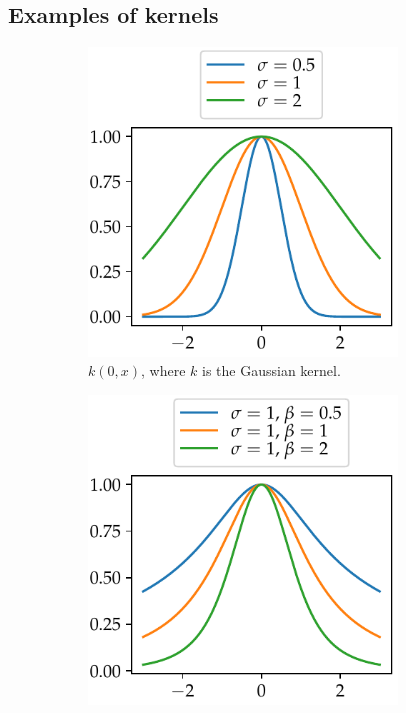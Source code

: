 \documentclass[11pt,twoside,openright]{report}
\begin{document}
\subsection{Examples of kernels}
\begin{figure}
  \centering
  \begin{subfigure}{0.5\textwidth}
    \centering
    \includegraphics[width=0.9\textwidth]{gaussian_kernel_plot.pdf}
    \caption{$k(0, x)$, where $k$ is the Gaussian kernel.}
    \label{fig:gaussian_kernel}
  \end{subfigure}%
  \begin{subfigure}{0.5\textwidth}
    \centering
    \includegraphics[width=0.9\textwidth]{rational_quadratic_kernel_plot.pdf}

\end{subfigure}
\end{figure}
\end{document}
